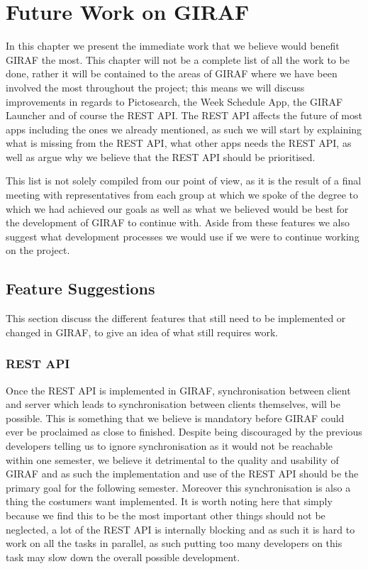\chapter{Future Work on GIRAF}\label{chp:futureworks}
In this chapter we present the immediate work that we believe would benefit GIRAF the most.
This chapter will not be a complete list of all the work to be done, rather it will be contained to the areas of GIRAF where we have been involved the most throughout the project; this means we will discuss improvements in regards to Pictosearch, the Week Schedule App, the GIRAF Launcher and of course the REST API.
The REST API affects the future of most apps including the ones we already mentioned, as such we will start by explaining what is missing from the REST API, what other apps needs the REST API, as well as argue why we believe that the REST API should be prioritised.

This list is not solely compiled from our point of view, as it is the result of a final meeting with representatives from each group at which we spoke of the degree to which we had achieved our goals as well as what we believed would be best for the development of GIRAF to continue with.
Aside from these features we also suggest what development processes we would use if we were to continue working on the project.

\section{Feature Suggestions}
This section discuss the different features that still need to be implemented or changed in GIRAF, to give an idea of what still requires work.

\subsection*{REST API}
Once the REST API is implemented in GIRAF, synchronisation between client and server which leads to synchronisation between clients themselves, will be possible.
This is something that we believe is mandatory before GIRAF could ever be proclaimed as close to finished.
Despite being discouraged by the previous developers telling us to ignore synchronisation as it would not be reachable within one semester, we believe it detrimental to the quality and usability of GIRAF and as such the implementation and use of the REST API should be the primary goal for the following semester.
Moreover this synchronisation is also a thing the costumers want implemented.
It is worth noting here that simply because we find this to be the most important other things should not be neglected, a lot of the REST API is internally blocking and as such it is hard to work on all the tasks in parallel, as such putting too many developers on this task may slow down the overall possible development.

